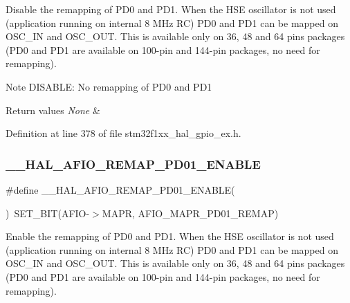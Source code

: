 Disable the remapping of P\+D0 and P\+D1. When the H\+SE oscillator is not used (application running on internal 8 M\+Hz RC) P\+D0 and P\+D1 can be mapped on O\+S\+C\+\_\+\+IN and O\+S\+C\+\_\+\+O\+UT. This is available only on 36, 48 and 64 pins packages (P\+D0 and P\+D1 are available on 100-\/pin and 144-\/pin packages, no need for remapping). 

\begin{DoxyNote}{Note}
D\+I\+S\+A\+B\+LE\+: No remapping of P\+D0 and P\+D1 
\end{DoxyNote}

\begin{DoxyRetVals}{Return values}
{\em None} & \\
\hline
\end{DoxyRetVals}


Definition at line 378 of file stm32f1xx\+\_\+hal\+\_\+gpio\+\_\+ex.\+h.

\mbox{\label{group___g_p_i_o_ex___a_f_i_o___a_f___r_e_m_a_p_p_i_n_g_ga556c166ea45a713875b6a179b101fa14}} 
\subsubsection{\texorpdfstring{\+\_\+\+\_\+\+H\+A\+L\+\_\+\+A\+F\+I\+O\+\_\+\+R\+E\+M\+A\+P\+\_\+\+P\+D01\+\_\+\+E\+N\+A\+B\+LE}{\_\_HAL\_AFIO\_REMAP\_PD01\_ENABLE}}
{\footnotesize\ttfamily \#define \+\_\+\+\_\+\+H\+A\+L\+\_\+\+A\+F\+I\+O\+\_\+\+R\+E\+M\+A\+P\+\_\+\+P\+D01\+\_\+\+E\+N\+A\+B\+LE(\begin{DoxyParamCaption}{ }\end{DoxyParamCaption})~S\+E\+T\+\_\+\+B\+IT(A\+F\+IO-\/$>$M\+A\+PR, A\+F\+I\+O\+\_\+\+M\+A\+P\+R\+\_\+\+P\+D01\+\_\+\+R\+E\+M\+AP)}



Enable the remapping of P\+D0 and P\+D1. When the H\+SE oscillator is not used (application running on internal 8 M\+Hz RC) P\+D0 and P\+D1 can be mapped on O\+S\+C\+\_\+\+IN and O\+S\+C\+\_\+\+O\+UT. This is available only on 36, 48 and 64 pins packages (P\+D0 and P\+D1 are available on 100-\/pin and 144-\/pin packages, no need for remapping). 

